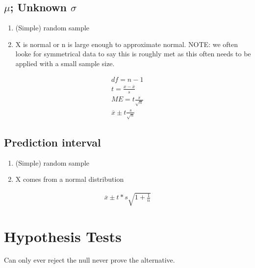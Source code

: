 \subsection{$\mu$; Unknown $\sigma$}
\begin{enumerate}
\item (Simple) random sample
\item X is normal or n is large enough to approximate normal. NOTE: we often looke for symmetrical data to say this is roughly met as this often needs to be applied with a small sample size.
\end{enumerate}

\begin{align}
  df = n - 1 \\
  t = \frac{x - \overbar{x}}{s} \\
  ME = t\frac{s}{\sqrt{n}} \\
  \overbar{x} \pm t\frac{s}{\sqrt{n}}
\end{align}

\subsection{Prediction interval}
\begin{enumerate}
\item (Simple) random sample
\item X comes from a normal distribution
\end{enumerate}

\begin{align}
  \overbar{x} \pm t * s\sqrt{1 + \frac{1}{n}}
\end{align}

\section{Hypothesis Tests}
Can only ever reject the null never prove the alternative.

